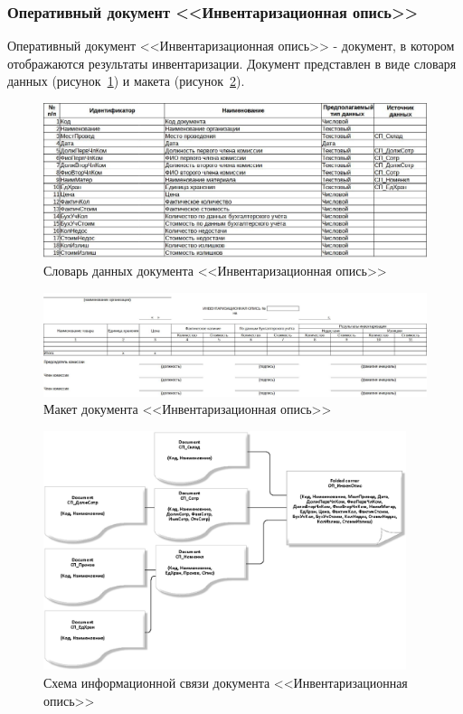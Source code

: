 \newpage
\subsubsection{Оперативный документ <<Инвентаризационная опись>>}

Оперативный документ <<Инвентаризационная опись>>
- документ, в котором отображаются результаты инвентаризации.
Документ представлен в виде словаря данных (рисунок~\ref{fig:OP_InvenOpis_tipi})
и макета (рисунок~\ref{fig:OP_InvenOpis_maket}).

\begin{figure}[!h]
    \centering
    \includegraphics[width=12cm]
        {_docs/ОП_ИнвенОпис_типы.jpg}
    \caption{Словарь данных документа <<Инвентаризационная опись>>}
    \label{fig:OP_InvenOpis_tipi}
\end{figure}

\begin{figure}[!h]
    \centering
    \includegraphics[width=14cm]
        {_docs/ОП_ИнвенОпис_макет.jpg}
    \caption{Макет документа <<Инвентаризационная опись>>}
    \label{fig:OP_InvenOpis_maket}
\end{figure}

\begin{figure}[!h]
    \centering
    \includegraphics[height=7cm]
        {_docs/ОП_ИнвенОпис_связи.png}
    \caption{Схема информационной связи документа <<Инвентаризационная опись>>}
    \label{fig:OP_InvenOpis_svazi}
\end{figure}

